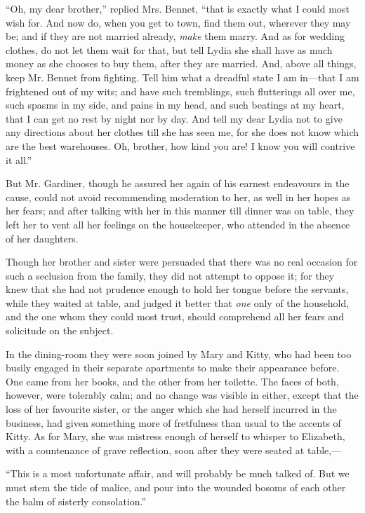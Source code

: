 \documentclass[12pt]{book}
\begin{document}
``Oh, my dear brother,'' replied Mrs. Bennet, ``that is exactly what I could most wish for. And now do, when you get to town, find them out, wherever they may be; and if they are not married already, \textit{make} them marry. And as for wedding clothes, do not let them wait for that, but tell Lydia she shall have as much money as she chooses to buy them, after they are married. And, above all things, keep Mr. Bennet from fighting. Tell him what a dreadful state I am in---that I am frightened out of my wits; and have such tremblings, such flutterings all over me, such spasms in my side, and pains in my head, and such beatings at my heart, that I can get no rest by night nor by day. And tell my dear Lydia not to give any directions about her clothes till she has seen me, for she does not know which are the best warehouses. Oh, brother, how kind you are! I know you will contrive it all.''

But Mr. Gardiner, though he assured her again of his earnest endeavours in the cause, could not avoid recommending moderation to her, as well in her hopes as her fears; and after talking with her in this manner till dinner was on table, they left her to vent all her feelings on the housekeeper, who attended in the absence of her daughters.

Though her brother and sister were persuaded that there was no real occasion for such a seclusion from the family, they did not attempt to oppose it; for they knew that she had not prudence enough to hold her tongue before the servants, while they waited at table, and judged it better that \textit{one} only of the household, and the one whom they could most trust, should comprehend all her fears and solicitude on the subject.

In the dining-room they were soon joined by Mary and Kitty, who had been too busily engaged in their separate apartments to make their appearance before. One came from her books, and the other from her toilette. The faces of both, however, were tolerably calm; and no change was visible in either, except that the loss of her favourite sister, or the anger which she had herself incurred in the business, had given something more of fretfulness than usual to the accents of Kitty. As for Mary, she was mistress enough of herself to whisper to Elizabeth, with a countenance of grave reflection, soon after they were seated at table,---

``This is a most unfortunate affair, and will probably be much talked of. But we must stem the tide of malice, and pour into the wounded bosoms of each other the balm of sisterly consolation.''
\end{document}
